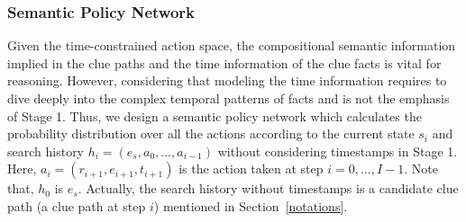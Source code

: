\documentclass[11pt,a4paper]{article}
\begin{document}
\subsubsection{Semantic Policy Network}
Given the time-constrained action space, the compositional semantic information
implied in the clue paths and the time information of the clue facts is vital
for reasoning. 
However, considering that modeling the time information requires to dive deeply
into the complex temporal patterns of facts and is not the emphasis of Stage 1.
Thus, we design a semantic policy network which calculates the probability
distribution over all the actions according to the current state $s_i$ and
search history $h_{i} = (e_s, a_{0},..., a_{i-1})$ without considering
timestamps in Stage 1. Here, $a_{i}=(r_{i+1}, e_{i+1}, t_{i+1})$ is the action
taken at step $i = 0,...,I-1$. Note that, $h_0$ is $e_s$. Actually, the search
history without timestamps is a candidate clue path (a clue path at step $i$)
mentioned in Section~\ref{notations}.
\end{document}
